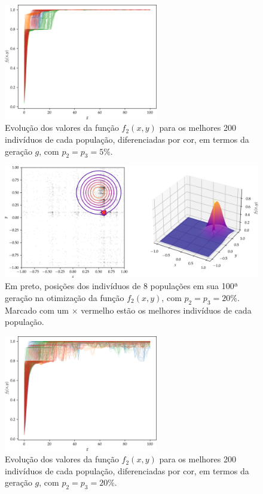 \begin{figure}[p]
  \centering
  \includegraphics[width=0.6\textwidth]{imagens/low_prob/evolution_near_gaussians.png}
  \caption{
    Evolução dos valores da função $ f_2(x,y) $ para os
    melhores 200 indivíduos de cada população, diferenciadas por cor, em termos da geração $g$,
    com $ p_2 = p_3 = 5\% $.
  }
  \label{fig:evolution_near_gaussians}
\end{figure}

\begin{figure}[p]
  \centering
  \includegraphics[width=\textwidth]{imagens/high_prob/position_near_gaussians.png}
  \caption{
    Em preto, posições dos indivíduos de 8 populações em sua 100ª geração na otimização da função
    $ f_2(x,y) $, com $ p_2 = p_3 = 20\% $. Marcado com um $\times$ vermelho estão os 
    melhores indivíduos de cada população.
  }
  \label{fig:position_near_gaussians_mut_20}
\end{figure}

\begin{figure}[p]
  \centering
  \includegraphics[width=0.6\textwidth]{imagens/high_prob/evolution_near_gaussians.png}
  \caption{
    Evolução dos valores da função $ f_2(x,y) $ para os
    melhores 200 indivíduos de cada população, diferenciadas por cor, em termos da geração $g$,
    com $ p_2 = p_3 = 20\% $.
  }
  \label{fig:evolution_near_gaussians_mut_20}
\end{figure}

